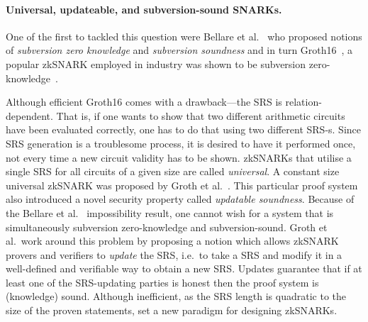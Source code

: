 \documentclass[runningheads,11pt]{llncs}
\theoremstyle{definition} \newtheorem{definition}[theorem]{Definition}
\begin{document}
\paragraph{Universal, updateable, and subversion-sound SNARKs.}
One of the first to tackled this question were Bellare et
al.~\cite{AC:BelFucSca16} who proposed notions of \emph{subversion zero
  knowledge} and \emph{subversion soundness} and in turn
Groth16~\cite{EC:Groth16}, a popular zkSNARK employed in industry was shown to
be subversion zero-knowledge~\cite{AC:ABLZ17,PKC:Fuchsbauer18}.
%
\iffalse
The former states that zero knowledge property persists even when
the SRS is produced by a malicious party. The latter states that the proof
system remains sound in the same situation. Importantly, Bellare et al.~shown
that no system can be simultaneously subversion zero-knowledge and subversion-sound.
Abdolmaleki et al.~\cite{AC:ABLZ17}, and independently Fuchsbauer
\cite{PKC:Fuchsbauer18}, shown that the most
efficient zkSNARK for QAP\footnote{QAP stands for Quadratic Arithmetic
Program. QAP is currently the most efficient representation of arithmetic
circuits for showing their validity.} by Groth \cite{EC:Groth16} can be made
subversion zero-knowledge by introducing minor modifications to its SRS and without
sacrificing its efficiency. 
\fi
%
Although efficient Groth16 comes with a drawback---the SRS is
relation-dependent. That is, if one wants to show that two different arithmetic
circuits have been evaluated correctly, one has to do that using two different
SRS-s.
Since SRS generation is a troublesome process, it is desired to have it
performed once, not every time a new circuit validity has to be shown. zkSNARKs
that utilise a single SRS for all circuits of a given size are called
\emph{universal}. A constant size universal zkSNARK was proposed by Groth et
al.~\cite{C:GKMMM18}. This particular proof system also introduced a novel
security property called \emph{updatable soundness}. Because of the Bellare et
al.~\cite{AC:BelFucSca16} impossibility result, one cannot wish for a system
that is simultaneously subversion zero-knowledge and subversion-sound. Groth et
al.~work around this problem by proposing a notion which allows zkSNARK provers
and verifiers to \emph{update} the SRS, i.e.~to take a SRS and modify it in a
well-defined and verifiable way to obtain a new SRS. Updates guarantee that if
at least one of the SRS-updating parties is honest then the proof system is
(knowledge) sound. Although inefficient, as the SRS length is quadratic to the
size of the proven statements, \cite{C:GKMMM18} set a new paradigm for designing
zkSNARKs.
\end{document}
